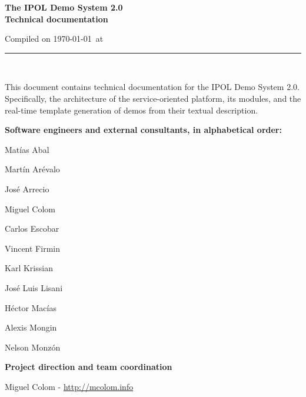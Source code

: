 \documentclass[a4paper,12pt]{article}
\begin{document}
\begin{titlepage}

\begin{center}
\vspace*{-1in}

\vspace*{0.6in}
\begin{Large}
\textbf{The IPOL Demo System 2.0 \\Technical documentation} \\
\end{Large}

\vspace*{0.6in}

\small{Compiled on \today\ at \currenttime}

\vspace*{0.6in}
\rule{80mm}{0.1mm}\\
\vspace*{0.1in}
\end{center}

\end{titlepage}

This document contains technical documentation for the IPOL Demo System 2.0. Specifically, the architecture of the service-oriented platform, its modules, and the real-time template generation of demos from their textual description.
\vspace*{0.6in}

\textbf{Software engineers and external consultants, in alphabetical order:}

Matías Abal

Martín Arévalo

José Arrecio

Miguel Colom

Carlos Escobar

Vincent Firmin

Karl Krissian

José Luis Lisani

Héctor Macías

Alexis Mongin

Nelson Monzón

\vspace*{0.2in}

\textbf{Project direction and team coordination}

Miguel Colom - \url{http://mcolom.info}



\newpage
\end{document}
